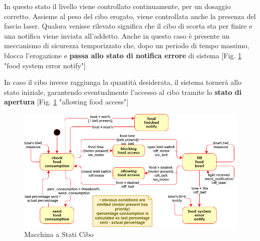     In questo stato il livello viene controllato continuamente, per un dosaggio corretto. Assieme al peso del cibo erogato, viene controllata anche la presenza del fascio laser. Qualora venisse rilevato significa che il cibo di scorta sta per finire e una notifica viene inviata all'addetto.
    Anche in questo caso è presente un meccanismo di sicurezza temporizzato che, dopo un periodo di tempo massimo, blocca l'erogazione e \textbf{passa allo stato di notifica errore} di sistema [Fig. \ref{fig:statediagramFood} "food system error notify"]
    
    In caso il cibo invece raggiunga la quantità desiderata, il sistema tornerà allo stato iniziale, garantendo eventualmente l'accesso al cibo tramite lo \textbf{stato di apertura} [Fig. \ref{fig:statediagramFood} "allowing food access"]    
    
    \begin{figure}[H]
        \caption{Macchina a Stati Cibo}
        \label{fig:statediagramFood}
        \centering
        \includegraphics[width=1\textwidth]{DrawIo/stateDiagramFood.png}
    \end{figure}
    
    
